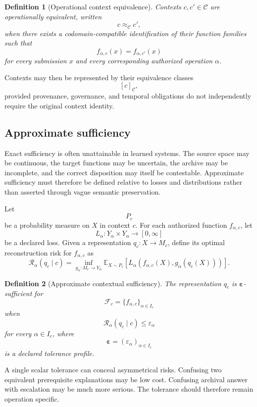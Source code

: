 \documentclass[11pt]{article}
\newtheorem{definition}{Definition}[section]
\theoremstyle{definition}
\newcommand{\E}{\mathbb{E}}
\newcommand{\F}{\mathcal{F}}
\newcommand{\eps}{\varepsilon}
\begin{document}
\begin{definition}[Operational context equivalence]
Contexts \(c,c'\in\mathcal C\) are operationally equivalent, written
\[
c\approx_{\mathcal C}c',
\]
when there exists a codomain-compatible identification of their function families such that
\[
f_{\alpha,c}(x)
=
f_{\alpha,c'}(x)
\]
for every submission \(x\) and every corresponding authorized operation \(\alpha\).
\end{definition}

Contexts may then be represented by their equivalence classes
\[
[c]_{\mathcal C},
\]
provided provenance, governance, and temporal obligations do not independently require the original context identity.

\subsection{Approximate sufficiency}

Exact sufficiency is often unattainable in learned systems. The source space may be continuous, the target functions may be uncertain, the archive may be incomplete, and the correct disposition may itself be contestable. Approximate sufficiency must therefore be defined relative to losses and distributions rather than asserted through vague semantic preservation.

Let
\[
P_c
\]
be a probability measure on \(X\) in context \(c\). For each authorized function \(f_{\alpha,c}\), let
\[
L_\alpha:
Y_\alpha\times Y_\alpha\to[0,\infty]
\]
be a declared loss. Given a representation \(q_c:X\to M_c\), define its optimal reconstruction risk for \(f_{\alpha,c}\) as
\[
\mathcal R_{\alpha}(q_c\mid c)
=
\inf_{g_\alpha:M_c\to Y_\alpha}
\E_{X\sim P_c}
\left[
L_\alpha
\left(
f_{\alpha,c}(X),
g_\alpha(q_c(X))
\right)
\right].
\]

\begin{definition}[Approximate contextual sufficiency]
The representation \(q_c\) is \(\bm{\eps}\)-sufficient for
\[
\F_c
=
\{f_{\alpha,c}\}_{\alpha\in I_c}
\]
when
\[
\mathcal R_\alpha(q_c\mid c)
\leq
\eps_\alpha
\]
for every \(\alpha\in I_c\), where
\[
\bm{\eps}
=
(\eps_\alpha)_{\alpha\in I_c}
\]
is a declared tolerance profile.
\end{definition}

A single scalar tolerance can conceal asymmetrical risks. Confusing two equivalent prerequisite explanations may be low cost. Confusing archival answer with escalation may be much more serious. The tolerance should therefore remain operation specific.
\end{document}
